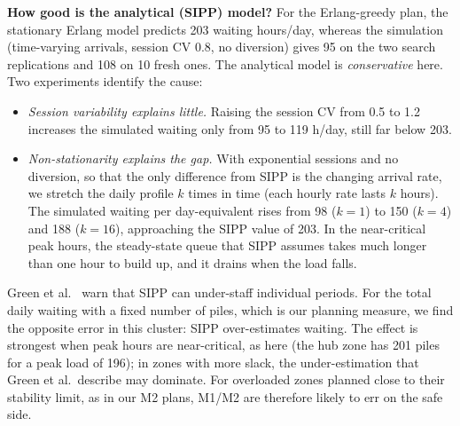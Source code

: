 \documentclass[11pt,a4paper]{article}
\begin{document}
\textbf{How good is the analytical (SIPP) model?} For the Erlang-greedy plan, the stationary Erlang model predicts 203 waiting hours/day, whereas the simulation (time-varying arrivals, session CV 0.8, no diversion) gives 95 on the two search replications and 108 on 10 fresh ones. The analytical model is \emph{conservative} here. Two experiments identify the cause:
\begin{itemize}[leftmargin=1.3em,itemsep=1pt]
\item \emph{Session variability explains little.} Raising the session CV from 0.5 to 1.2 increases the simulated waiting only from 95 to 119 h/day, still far below 203.
\item \emph{Non-stationarity explains the gap.} With exponential sessions and no diversion, so that the only difference from SIPP is the changing arrival rate, we stretch the daily profile $k$ times in time (each hourly rate lasts $k$ hours). The simulated waiting per day-equivalent rises from 98 ($k=1$) to 150 ($k=4$) and 188 ($k=16$), approaching the SIPP value of 203. In the near-critical peak hours, the steady-state queue that SIPP assumes takes much longer than one hour to build up, and it drains when the load falls.
\end{itemize}
Green et al.~\cite{green2001} warn that SIPP can under-staff individual periods. For the total daily waiting with a fixed number of piles, which is our planning measure, we find the opposite error in this cluster: SIPP over-estimates waiting. The effect is strongest when peak hours are near-critical, as here (the hub zone has 201 piles for a peak load of 196); in zones with more slack, the under-estimation that Green et al.\ describe may dominate. For overloaded zones planned close to their stability limit, as in our M2 plans, M1/M2 are therefore likely to err on the safe side.
\end{document}
